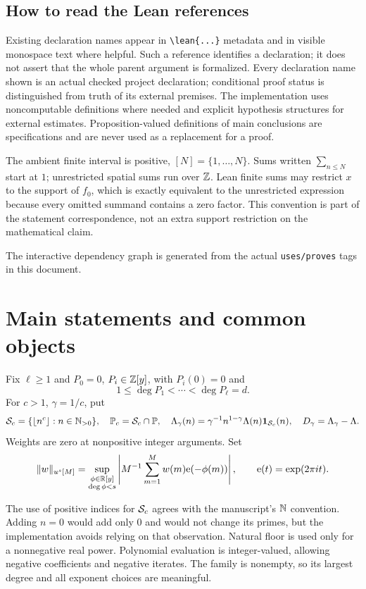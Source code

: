 \subsection*{How to read the Lean references}
Existing declaration names appear in \verb|\lean{...}| metadata and in visible monospace text where helpful. Such a reference identifies a declaration; it does not assert that the whole parent argument is formalized. Every declaration name shown is an actual checked project declaration; conditional proof status is distinguished from truth of its external premises. The implementation uses noncomputable definitions where needed and explicit hypothesis structures for external estimates. Proposition-valued definitions of main conclusions are specifications and are never used as a replacement for a proof.

The ambient finite interval is positive, $[N]=\{1,\ldots,N\}$. Sums written $\sum_{n\leq N}$ start at $1$; unrestricted spatial sums run over $\mathbb Z$. Lean finite sums may restrict $x$ to the support of $f_0$, which is exactly equivalent to the unrestricted expression because every omitted summand contains a zero factor. This convention is part of the statement correspondence, not an extra support restriction on the mathematical claim.
\fi

\ifdefined\WebVersion
The interactive dependency graph is generated from the actual \texttt{uses/proves} tags in this document.\else\fi

\section{Main statements and common objects}
\begin{definition}\label{def:objects}
Fix $\ell\geq1$ and $P_0=0$, $P_i\in\mathbb Z[y]$, with $P_i(0)=0$ and
\[
 1\leq\deg P_1<\cdots<\deg P_\ell=d.
\]
For $c>1$, $\gamma=1/c$, put
\[
 \mathcal S_c=\{\lfloor n^c\rfloor:n\in\mathbb N_{>0}\},\quad
 \mathbb P_c=\mathcal S_c\cap\mathbb P,\quad
 \Lambda_\gamma(n)=\gamma^{-1}n^{1-\gamma}\Lambda(n)\mathbf 1_{\mathcal S_c}(n),\quad
 D_\gamma=\Lambda_\gamma-\Lambda.
\]
Weights are zero at nonpositive integer arguments. Set
\[
 \|w\|_{u^s[M]}=
 \sup_{\substack{\phi\in\mathbb R[y]\\\deg\phi<s}}
 \left|M^{-1}\sum_{m=1}^M w(m)\mathrm e(-\phi(m))\right|,
 \qquad\mathrm e(t)=\exp(2\pi it).
\]
\end{definition}
\ifDetailed
The use of positive indices for $\mathcal S_c$ agrees with the manuscript's $\mathbb N$ convention. Adding $n=0$ would add only $0$ and would not change its primes, but the implementation avoids relying on that observation. Natural floor is used only for a nonnegative real power. Polynomial evaluation is integer-valued, allowing negative coefficients and negative iterates. The family is nonempty, so its largest degree and all exponent choices are meaningful.

